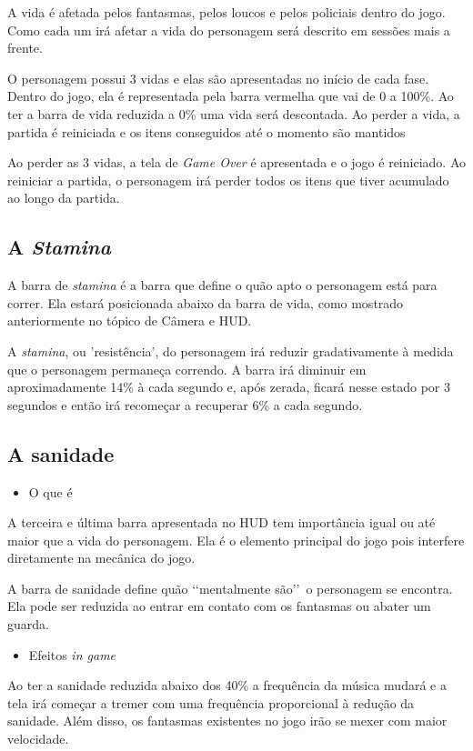 \documentclass[12pt]{article}
\begin{document}
A vida é afetada pelos fantasmas, pelos loucos e pelos policiais dentro do jogo. Como cada um irá afetar a vida do personagem será descrito em sessões mais a frente.

O personagem possui 3 vidas e elas são apresentadas no início de cada fase. Dentro do jogo, ela é representada pela barra vermelha que vai de 0 a 100\%. Ao ter a barra de vida reduzida a 0\% uma vida será descontada. Ao perder a vida, a partida é reiniciada e os itens conseguidos até o momento são mantidos

Ao perder as 3 vidas, a tela de \textit{Game Over} é apresentada e o jogo é reiniciado. Ao reiniciar a partida, o personagem irá perder todos os itens que tiver acumulado ao longo da partida.

\subsection{A \textit{Stamina}}
A barra de \textit{stamina} é a barra que define o quão apto o personagem está para correr. Ela estará posicionada abaixo da barra de vida, como mostrado anteriormente no tópico de Câmera e HUD.

A \textit{stamina}, ou 'resistência', do personagem irá reduzir gradativamente à medida que o personagem permaneça correndo. A barra irá diminuir em aproximadamente 14\% à cada segundo e, após zerada, ficará nesse estado por 3 segundos e então irá recomeçar a recuperar 6\% a cada segundo.

\subsection{A sanidade}
\begin{itemize}
\item O que é
\end{itemize}
A terceira e última barra apresentada no HUD tem importância igual ou até maior que a vida do personagem. Ela é o elemento principal do jogo pois interfere diretamente na mecânica do jogo. 

A barra de sanidade define quão \lq\lq mentalmente são\rq\rq\ o personagem se encontra. Ela pode ser reduzida ao entrar em contato com os fantasmas ou abater um guarda. 

\begin{itemize}
\item Efeitos \textit{in game}
\end{itemize}
Ao ter a sanidade reduzida abaixo dos 40\% a frequência da música mudará e a tela irá começar a tremer com uma frequência proporcional à redução da sanidade. Além disso, os fantasmas existentes no jogo irão se mexer com maior velocidade.
\end{document}
